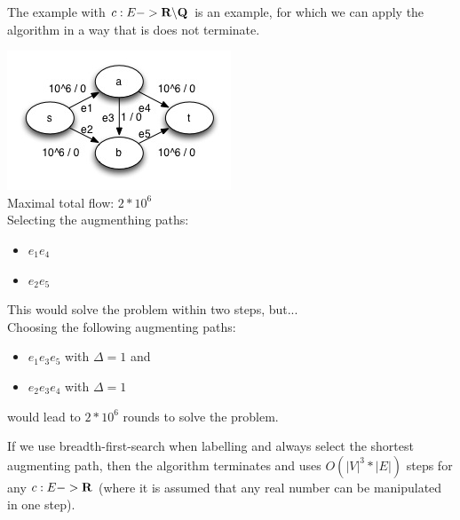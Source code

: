\begin{proposition}
The example with $c: E -> \textbf{R} \backslash \textbf{Q}$ is an example, for which we can apply the algorithm in a way that is does not terminate. 
\end{proposition}

\begin{example}
\includegraphics{diagrams/Chapter3_Example_4.jpg} \\
Maximal total flow: $2 * 10^6$ \\
Selecting the augmenthing paths: 
\begin{itemize}
\item $e_1 e_4$ 
\item $e_2 e_5$
\end{itemize}
This would solve the problem within two steps, but... \\
Choosing the following augmenting paths: 
\begin{itemize}
\item $e_1 e_3 e_5$ with $\Delta = 1$ and
\item $e_2 e_3 e_4$ with $\Delta = 1$ 
\end{itemize}
would lead to $2*10^6$ rounds to solve the problem. 
\end{example}

\begin{theorem}
If we use breadth-first-search when labelling and always select the shortest augmenting path, then the algorithm terminates and uses $O(|V|^3 * |E|)$ steps for any $c:E -> \textbf{R}$ (where it is assumed that any real number can be manipulated in one step).
\end{theorem}

